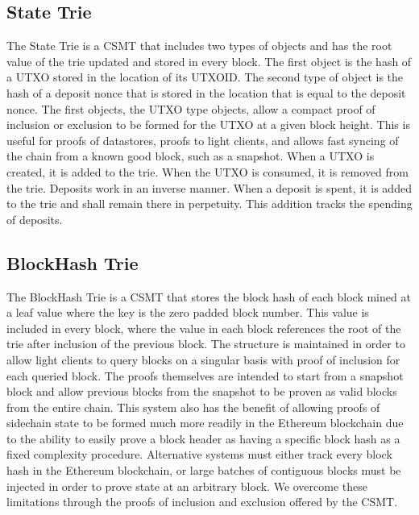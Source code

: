 \subsection{State Trie}

The State Trie is a CSMT that includes two types of objects and has the
root value of the trie updated and stored in every block.
The first object is the hash of a UTXO stored in the location of its UTXOID.
The second type of object is the hash of a deposit nonce that is stored
in the location that is equal to the deposit nonce.
The first objects, the UTXO type objects, allow a compact proof of
inclusion or exclusion to be formed for the UTXO at a given block height.
This is useful for proofs of datastores, proofs to light clients, and
allows fast syncing of the chain from a known good block, such as a snapshot.
When a UTXO is created, it is added to the trie.
When the UTXO is consumed, it is removed from the trie.
Deposits work in an inverse manner.
When a deposit is spent, it is added to the trie and shall remain there
in perpetuity.
This addition tracks the spending of deposits.

\subsection{BlockHash Trie}

The BlockHash Trie is a CSMT that stores the block hash of each block
mined at a leaf value where the key is the zero padded block number.
This value is included in every block, where the value in each block
references the root of the trie after inclusion of the previous block.
The structure is maintained in order to allow light clients to query
blocks on a singular basis with proof of inclusion for each queried block.
The proofs themselves are intended to start from a snapshot block and
allow previous blocks from the snapshot to be proven as valid blocks
from the entire chain.
This system also has the benefit of allowing proofs of sidechain state
to be formed much more readily in the Ethereum blockchain due to the
ability to easily prove a block header as having a specific block hash
as a fixed complexity procedure.
Alternative systems must either track every block hash in the Ethereum
blockchain, or large batches of contiguous blocks must be injected in
order to prove state at an arbitrary block.
We overcome these limitations through the proofs of inclusion and
exclusion offered by the CSMT.
